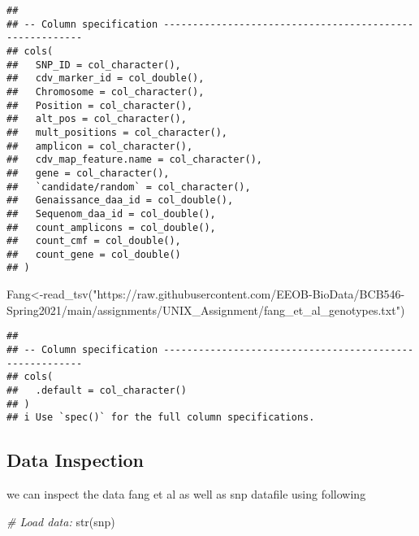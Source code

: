 \documentclass[
]{article}
\newenvironment{Shaded}{\begin{snugshade}}{\end{snugshade}}
\newcommand{\CommentTok}[1]{\textcolor[rgb]{0.56,0.35,0.01}{\textit{#1}}}
\newcommand{\FunctionTok}[1]{\textcolor[rgb]{0.00,0.00,0.00}{#1}}
\newcommand{\NormalTok}[1]{#1}
\newcommand{\OtherTok}[1]{\textcolor[rgb]{0.56,0.35,0.01}{#1}}
\newcommand{\StringTok}[1]{\textcolor[rgb]{0.31,0.60,0.02}{#1}}
\begin{document}
\begin{verbatim}
## 
## -- Column specification --------------------------------------------------------
## cols(
##   SNP_ID = col_character(),
##   cdv_marker_id = col_double(),
##   Chromosome = col_character(),
##   Position = col_character(),
##   alt_pos = col_character(),
##   mult_positions = col_character(),
##   amplicon = col_character(),
##   cdv_map_feature.name = col_character(),
##   gene = col_character(),
##   `candidate/random` = col_character(),
##   Genaissance_daa_id = col_double(),
##   Sequenom_daa_id = col_double(),
##   count_amplicons = col_double(),
##   count_cmf = col_double(),
##   count_gene = col_double()
## )
\end{verbatim}

\begin{Shaded}
\begin{Highlighting}[]
\NormalTok{Fang}\OtherTok{\textless{}{-}}\FunctionTok{read\_tsv}\NormalTok{(}\StringTok{"https://raw.githubusercontent.com/EEOB{-}BioData/BCB546{-}Spring2021/main/assignments/UNIX\_Assignment/fang\_et\_al\_genotypes.txt"}\NormalTok{)}
\end{Highlighting}
\end{Shaded}

\begin{verbatim}
## 
## -- Column specification --------------------------------------------------------
## cols(
##   .default = col_character()
## )
## i Use `spec()` for the full column specifications.
\end{verbatim}

\hypertarget{data-inspection}{%
\subsection{Data Inspection}\label{data-inspection}}

we can inspect the data fang et al as well as snp datafile using
following

\begin{Shaded}
\begin{Highlighting}[]
\CommentTok{\# Load data:}
\FunctionTok{str}\NormalTok{(snp)}
\end{Highlighting}
\end{Shaded}
\end{document}
